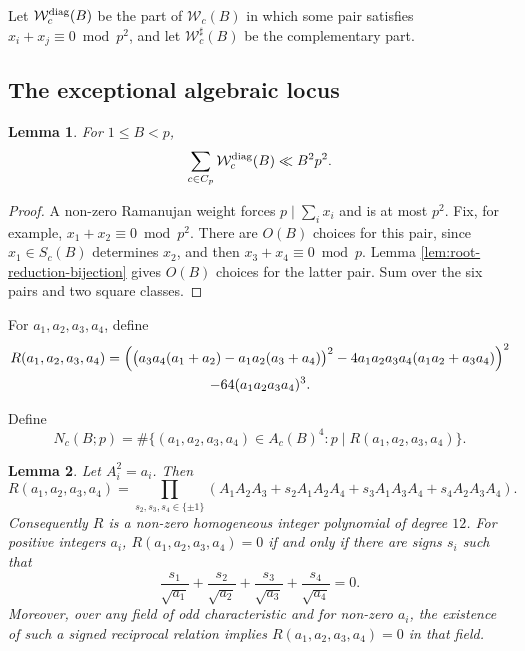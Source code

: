 \documentclass[12pt, a4paper]{amsart}
\numberwithin{equation}{section}
\renewcommand{\le}{\leqslant}
\theoremstyle{plain}
\newtheorem{lem}{Lemma}[section]
\begin{document}
Let $\mathcal W_c^{\rm diag}(B)$ be the part of $\mathcal W_c(B)$ in which some pair satisfies $x_i+x_j\equiv0\bmod {p^2}$, and let $\mathcal W_c^\sharp(B)$ be the complementary part.

\subsection{The exceptional algebraic locus}

\begin{lem}\label{lem:diag}
For $1\le B<p$,
$$
\sum_{c\in C_p}\mathcal W_c^{\rm diag}(B)\ll B^2p^2.
$$
\end{lem}

\begin{proof}
A non-zero Ramanujan weight forces $p\mid\sum_ix_i$ and is at most $p^2$. Fix, for example, $x_1+x_2\equiv 0\bmod {p^2}$. There are $O(B)$ choices for this pair, since $x_1\in S_c(B)$ determines $x_2$, and then $x_3+x_4\equiv 0\bmod p$. Lemma \ref{lem:root-reduction-bijection} gives $O(B)$ choices for the latter pair. Sum over the six pairs and two square classes.
\end{proof}

For $a_1,a_2,a_3,a_4$, define
\begin{multline*}
R(a_1,a_2,a_3,a_4)=\Bigl(\bigl(a_3a_4(a_1+a_2)-a_1a_2(a_3+a_4)\bigr)^2-4a_1a_2a_3a_4(a_1a_2+a_3a_4)\Bigr)^2\\
-64(a_1a_2a_3a_4)^3.
\end{multline*}

Define
$$
N_c(B;p)=
\#\{(a_1,a_2,a_3,a_4)\in A_c(B)^4:
p\mid R(a_1,a_2,a_3,a_4)\}.
$$

\begin{lem}\label{lem:eliminant-identity}
Let $A_i^2=a_i$. Then
$$
R(a_1,a_2,a_3,a_4)
=
\prod_{s_2,s_3,s_4\in\{\pm1\}}
(A_1A_2A_3+s_2A_1A_2A_4
+s_3A_1A_3A_4+s_4A_2A_3A_4).
$$
Consequently $R$ is a non-zero homogeneous integer polynomial of degree $12$. For positive integers $a_i$, $R(a_1,a_2,a_3,a_4)=0$ if and only if there are signs $s_i$ such that
$$
\frac{s_1}{\sqrt{a_1}}+
\frac{s_2}{\sqrt{a_2}}+
\frac{s_3}{\sqrt{a_3}}+
\frac{s_4}{\sqrt{a_4}}=0.
$$
Moreover, over any field of odd characteristic and for non-zero $a_i$, the existence of such a signed reciprocal relation implies $R(a_1,a_2,a_3,a_4)=0$ in that field.
\end{lem}
\end{document}
